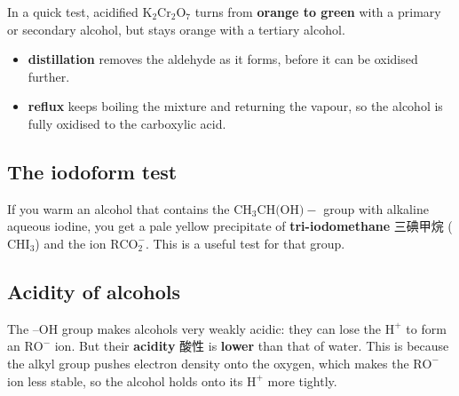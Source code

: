 \documentclass[11pt]{article}
\begin{document}
In a quick test, acidified $\text{K}_2\text{Cr}_2\text{O}_7$ turns from \textbf{orange to green} with a primary or secondary alcohol, but stays orange with a tertiary alcohol.

\begin{itemize}
\item \textbf{distillation} removes the aldehyde as it forms, before it can be oxidised further.

\item \textbf{reflux} keeps boiling the mixture and returning the vapour, so the alcohol is fully oxidised to the carboxylic acid.

\end{itemize}

\subsection*{The iodoform test}

If you warm an alcohol that contains the $\text{CH}_3\text{CH(OH)}-$ group with alkaline aqueous iodine, you get a pale yellow precipitate of \textbf{tri-iodomethane} 三碘甲烷 ($\text{CHI}_3$) and the ion $\text{RCO}_2^-$. This is a useful test for that group.

\subsection*{Acidity of alcohols}

The $\text{–OH}$ group makes alcohols very weakly acidic: they can lose the $\text{H}^+$ to form an $\text{RO}^-$ ion. But their \textbf{acidity} 酸性 is \textbf{lower} than that of water. This is because the alkyl group pushes electron density onto the oxygen, which makes the $\text{RO}^-$ ion less stable, so the alcohol holds onto its $\text{H}^+$ more tightly.
\end{document}
